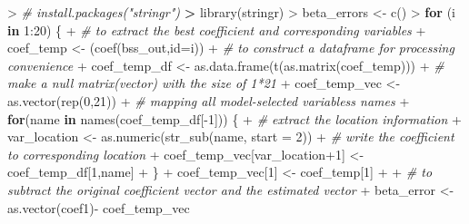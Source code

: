 \documentclass[
]{article}
\newenvironment{Shaded}{\begin{snugshade}}{\end{snugshade}}
\newcommand{\AttributeTok}[1]{\textcolor[rgb]{0.77,0.63,0.00}{#1}}
\newcommand{\CommentTok}[1]{\textcolor[rgb]{0.56,0.35,0.01}{\textit{#1}}}
\newcommand{\ControlFlowTok}[1]{\textcolor[rgb]{0.13,0.29,0.53}{\textbf{#1}}}
\newcommand{\DecValTok}[1]{\textcolor[rgb]{0.00,0.00,0.81}{#1}}
\newcommand{\ErrorTok}[1]{\textcolor[rgb]{0.64,0.00,0.00}{\textbf{#1}}}
\newcommand{\FunctionTok}[1]{\textcolor[rgb]{0.00,0.00,0.00}{#1}}
\newcommand{\NormalTok}[1]{#1}
\newcommand{\OtherTok}[1]{\textcolor[rgb]{0.56,0.35,0.01}{#1}}
\newcommand{\SpecialCharTok}[1]{\textcolor[rgb]{0.00,0.00,0.00}{#1}}
\begin{document}
\begin{Shaded}
\begin{Highlighting}[]
\SpecialCharTok{\textgreater{}} \CommentTok{\# install.packages("stringr")}
\ErrorTok{\textgreater{}} \FunctionTok{library}\NormalTok{(stringr)}
\SpecialCharTok{\textgreater{}}\NormalTok{ beta\_errors }\OtherTok{\textless{}{-}} \FunctionTok{c}\NormalTok{()}
\SpecialCharTok{\textgreater{}} \ControlFlowTok{for}\NormalTok{ (i }\ControlFlowTok{in} \DecValTok{1}\SpecialCharTok{:}\DecValTok{20}\NormalTok{) \{}
\SpecialCharTok{+}   \CommentTok{\# to extract the best coefficient and corresponding variables}
\SpecialCharTok{+}\NormalTok{   coef\_temp }\OtherTok{\textless{}{-}}\NormalTok{ (}\FunctionTok{coef}\NormalTok{(bss\_out,}\AttributeTok{id=}\NormalTok{i))}
\SpecialCharTok{+}   \CommentTok{\# to construct a dataframe for processing convenience}
\SpecialCharTok{+}\NormalTok{   coef\_temp\_df }\OtherTok{\textless{}{-}} \FunctionTok{as.data.frame}\NormalTok{(}\FunctionTok{t}\NormalTok{(}\FunctionTok{as.matrix}\NormalTok{(coef\_temp)))}
\SpecialCharTok{+}   \CommentTok{\# make a null matrix(vector) with the size of 1*21}
\SpecialCharTok{+}\NormalTok{   coef\_temp\_vec }\OtherTok{\textless{}{-}} \FunctionTok{as.vector}\NormalTok{(}\FunctionTok{rep}\NormalTok{(}\DecValTok{0}\NormalTok{,}\DecValTok{21}\NormalTok{))}
\SpecialCharTok{+}   \CommentTok{\# mapping all model{-}selected variables\textquotesingle{}s names}
\SpecialCharTok{+}   \ControlFlowTok{for}\NormalTok{(name }\ControlFlowTok{in} \FunctionTok{names}\NormalTok{(coef\_temp\_df[}\SpecialCharTok{{-}}\DecValTok{1}\NormalTok{])) \{}
\SpecialCharTok{+}     \CommentTok{\# extract the location information}
\SpecialCharTok{+}\NormalTok{     var\_location }\OtherTok{\textless{}{-}} \FunctionTok{as.numeric}\NormalTok{(}\FunctionTok{str\_sub}\NormalTok{(name, }\AttributeTok{start =} \DecValTok{2}\NormalTok{))}
\SpecialCharTok{+}     \CommentTok{\# write the coefficient to corresponding location}
\SpecialCharTok{+}\NormalTok{     coef\_temp\_vec[var\_location}\SpecialCharTok{+}\DecValTok{1}\NormalTok{] }\OtherTok{\textless{}{-}}\NormalTok{ coef\_temp\_df[}\DecValTok{1}\NormalTok{,name]}
\SpecialCharTok{+}\NormalTok{   \}}
\SpecialCharTok{+}\NormalTok{   coef\_temp\_vec[}\DecValTok{1}\NormalTok{] }\OtherTok{\textless{}{-}}\NormalTok{ coef\_temp[}\DecValTok{1}\NormalTok{]}
\SpecialCharTok{+}   
\SpecialCharTok{+}   \CommentTok{\# to subtract the original coefficient vector and the estimated vector}
\SpecialCharTok{+}\NormalTok{   beta\_error }\OtherTok{\textless{}{-}} \FunctionTok{as.vector}\NormalTok{(coef1)}\SpecialCharTok{{-}}\NormalTok{ coef\_temp\_vec}

\end{Highlighting}
\end{Shaded}
\end{document}
